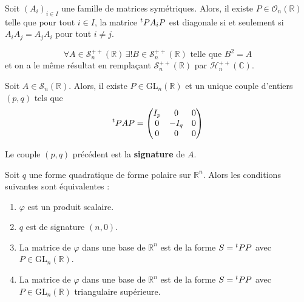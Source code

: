   \begin{application}
    Soit $(A_i)_{i \in I}$ une famille de matrices symétriques. Alors, il existe $P \in \mathcal{O}_n(\mathbb{R})$ telle que pour tout $i \in I$, la matrice $\mathstrut ^t P A_i P$ est diagonale si et seulement si $A_i A_j = A_j A_i$ pour tout $i \neq j$.
  \end{application}


  \begin{application}
    \[ \forall A \in \mathcal{S}_n^{++}(\mathbb{R}) \, \exists! B \in \mathcal{S}_n^{++}(\mathbb{R}) \text{ telle que } B^2 = A \]
    et on a le même résultat en remplaçant $\mathcal{S}_n^{++}(\mathbb{R})$ par $\mathcal{H}_n^{++}(\mathbb{C})$.
  \end{application}


  \begin{theorem}
    Soit $A \in \mathcal{S}_n(\mathbb{R})$. Alors, il existe $P \in \mathrm{GL}_n(\mathbb{R})$ et un unique couple d'entiers $(p,q)$ tels que
    \[ \mathstrut ^t PAP = \begin{pmatrix} I_p & 0 & 0 \\ 0 & -I_q & 0 \\ 0 & 0 & 0 \end{pmatrix} \]
  \end{theorem}

  \begin{definition}
    Le couple $(p,q)$ précédent est la \textbf{signature} de $A$.
  \end{definition}

  \begin{proposition}
    Soit $q$ une forme quadratique de forme polaire sur $\mathbb{R}^n$. Alors les conditions suivantes sont équivalentes :
    \begin{enumerate}[label=(\roman*)]
      \item $\varphi$ est un produit scalaire.
      \item $q$ est de signature $(n,0)$.
      \item La matrice de $\varphi$ dans une base de $\mathbb{R}^n$ est de la forme $S = \mathstrut ^t PP$ avec $P \in \mathrm{GL}_n(\mathbb{R})$.
      \item La matrice de $\varphi$ dans une base de $\mathbb{R}^n$ est de la forme $S = \mathstrut ^t PP$ avec $P \in \mathrm{GL}_n(\mathbb{R})$ triangulaire supérieure.
    \end{enumerate}
  \end{proposition}

